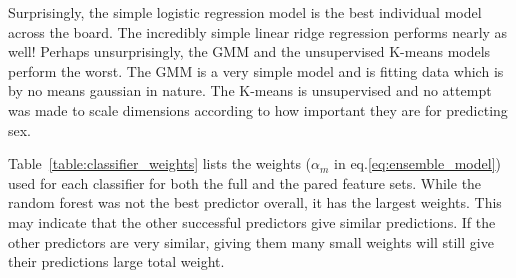 \documentclass{article} %
\begin{document}
Surprisingly, the simple logistic regression model is the best individual model across the board.  The incredibly simple linear ridge regression performs nearly as well! Perhaps unsurprisingly, the GMM and the unsupervised K-means models perform the worst.  The GMM is a very simple model and is fitting data which is by no means gaussian in nature.  The K-means is unsupervised and no attempt was made to scale dimensions according to how important they are for predicting sex.

Table~\ref{table:classifier_weights} lists the weights ($\alpha_m$ in eq.\ref{eq:ensemble_model}) used for each classifier for both the full and the pared feature sets.  While the random forest was not the best predictor overall, it has the largest weights.  This may indicate that the other successful predictors give similar predictions.  If the other predictors are very similar, giving them many small weights will still give their predictions large total weight.
\end{document}
